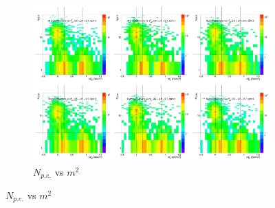 \begin{figure}[H]
  \centering
    \begin{subfigure}{1\textwidth}
    \includegraphics[width=1\textwidth]{hiptfits/pos/PSaccthreshold_cent0_ich1_accfire0_ptbin10.jpg}
    \caption{$N_{p.e.}$ vs $m^2$}
    \end{subfigure}
\end{figure}
